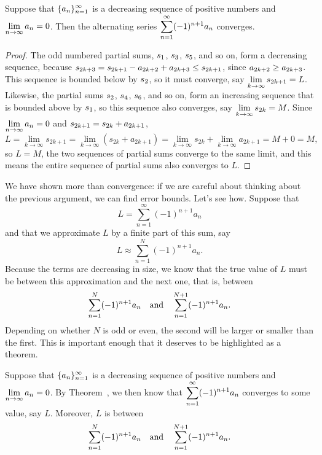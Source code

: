 \begin{theorem}
\label{thm:alternating-series-test}
Suppose that $\displaystyle\{a_n\}_{n=1}^\infty$ is a decreasing
sequence of positive numbers and $\displaystyle\lim_{n\to\infty}a_n=0$. Then the
alternating series $\displaystyle\sum_{n=1}^\infty (-1)^{n+1} a_n$ converges.
\end{theorem}



\begin{proof} The odd numbered partial sums, $\displaystyle s_1$, $\displaystyle s_3$, $\displaystyle s_5$,
and so on, form a decreasing sequence, because
$\displaystyle s_{2k+3}=s_{2k+1}-a_{2k+2}+a_{2k+3}\le s_{2k+1}$, since
$\displaystyle a_{2k+2}\ge a_{2k+3}$. This sequence is bounded below by
$\displaystyle s_2$, so it must converge, say 
$\displaystyle\lim_{k\to\infty}s_{2k+1}=L$.
Likewise, the partial sums $\displaystyle s_2$, $\displaystyle s_4$, $\displaystyle s_6$,
and so on, form an increasing sequence that is bounded above by
$\displaystyle s_1$, so this sequence also converges, say 
$\displaystyle\lim_{k\to\infty}s_{2k}=M$. Since $\displaystyle\lim_{n\to\infty} a_n=0$ and
$\displaystyle s_{2k+1}= s_{2k}+a_{2k+1}$,
$$
  L=\lim_{k\to\infty}s_{2k+1}=\lim_{k\to\infty}(s_{2k}+a_{2k+1})=
  \lim_{k\to\infty}s_{2k}+\lim_{k\to\infty}a_{2k+1}=M+0=M,
$$
so $L=M$, the two sequences of partial sums converge to the same
limit, and this means the entire sequence of partial sums also
converges to $L$.
\end{proof}

We have shown more than convergence: if we are careful about thinking
about the previous argument, we can find error bounds. Let's see
how. Suppose that
$$L=\sum_{n=1}^\infty (-1)^{n+1} a_n$$
and that we approximate $L$ by a finite part of this sum, say
$$L\approx \sum_{n=1}^N (-1)^{n+1} a_n.$$
Because the terms are decreasing in size, we know that the true value
of $L$ must be between this approximation and the next one, that is,
between 
$$
  \sum_{n=1}^N (-1)^{n+1} a_n \hbox{\quad and\quad}
  \sum_{n=1}^{N+1} (-1)^{n+1} a_n.
$$
Depending on whether $N$ is odd or even, the second will be larger or
smaller than the first.  This is important enough that it deserves to
be highlighted as a theorem.

\begin{theorem}
\label{thm:alternating-series-error-bounds}
  Suppose that $\displaystyle\{a_n\}_{n=1}^\infty$ is a decreasing sequence of
  positive numbers and $\displaystyle\lim_{n\to\infty}a_n=0$. By
  Theorem~, we then know that
  $\displaystyle\sum_{n=1}^\infty (-1)^{n+1} a_n$ converges to some value, say
  $L$.  Moreover, $L$ is between
  $$
  \sum_{n=1}^N (-1)^{n+1} a_n \hbox{\quad and\quad}
  \sum_{n=1}^{N+1} (-1)^{n+1} a_n.
  $$
\end{theorem}




